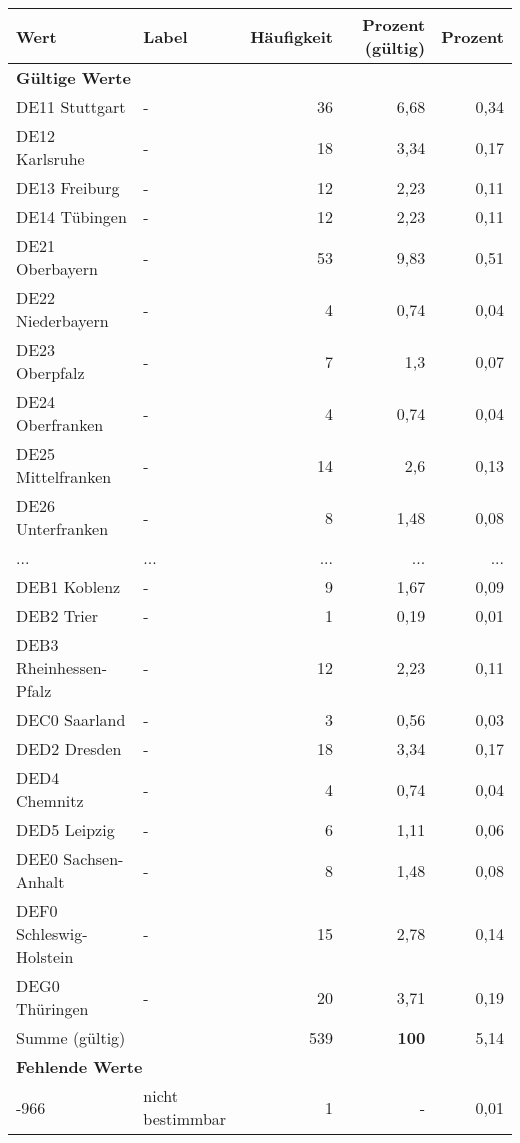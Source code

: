      \begin{longtable}{Xlrrr}
     \toprule
     \textbf{Wert} & \textbf{Label} & \textbf{Häufigkeit} & \textbf{Prozent (gültig)} & \textbf{Prozent} \\
     \endhead
     \midrule
     \multicolumn{5}{l}{\textbf{Gültige Werte}}\\
        \multicolumn{1}{X}{DE11 Stuttgart} & - & 36 & 6,68 & 0,34 \\
        \multicolumn{1}{X}{DE12 Karlsruhe} & - & 18 & 3,34 & 0,17 \\
        \multicolumn{1}{X}{DE13 Freiburg} & - & 12 & 2,23 & 0,11 \\
        \multicolumn{1}{X}{DE14 Tübingen} & - & 12 & 2,23 & 0,11 \\
        \multicolumn{1}{X}{DE21 Oberbayern} & - & 53 & 9,83 & 0,51 \\
        \multicolumn{1}{X}{DE22 Niederbayern} & - & 4 & 0,74 & 0,04 \\
        \multicolumn{1}{X}{DE23 Oberpfalz} & - & 7 & 1,3 & 0,07 \\
        \multicolumn{1}{X}{DE24 Oberfranken} & - & 4 & 0,74 & 0,04 \\
        \multicolumn{1}{X}{DE25 Mittelfranken} & - & 14 & 2,6 & 0,13 \\
        \multicolumn{1}{X}{DE26 Unterfranken} & - & 8 & 1,48 & 0,08 \\
       ... & ... & ... & ... & ... \\
        \multicolumn{1}{X}{DEB1 Koblenz} & - & 9 & 1,67 & 0,09 \\
        \multicolumn{1}{X}{DEB2 Trier} & - & 1 & 0,19 & 0,01 \\
        \multicolumn{1}{X}{DEB3 Rheinhessen-Pfalz} & - & 12 & 2,23 & 0,11 \\
        \multicolumn{1}{X}{DEC0 Saarland} & - & 3 & 0,56 & 0,03 \\
        \multicolumn{1}{X}{DED2 Dresden} & - & 18 & 3,34 & 0,17 \\
        \multicolumn{1}{X}{DED4 Chemnitz} & - & 4 & 0,74 & 0,04 \\
        \multicolumn{1}{X}{DED5 Leipzig} & - & 6 & 1,11 & 0,06 \\
        \multicolumn{1}{X}{DEE0 Sachsen-Anhalt} & - & 8 & 1,48 & 0,08 \\
        \multicolumn{1}{X}{DEF0 Schleswig-Holstein} & - & 15 & 2,78 & 0,14 \\
        \multicolumn{1}{X}{DEG0 Thüringen} & - & 20 & 3,71 & 0,19 \\
     \midrule
      \multicolumn{2}{l}{Summe (gültig)} & 539 &
      \textbf{100} &
         5,14 \\
     \multicolumn{5}{l}{\textbf{Fehlende Werte}}\\
       -966 & nicht bestimmbar & 1 & - & 0,01 \\


\end{longtable}
